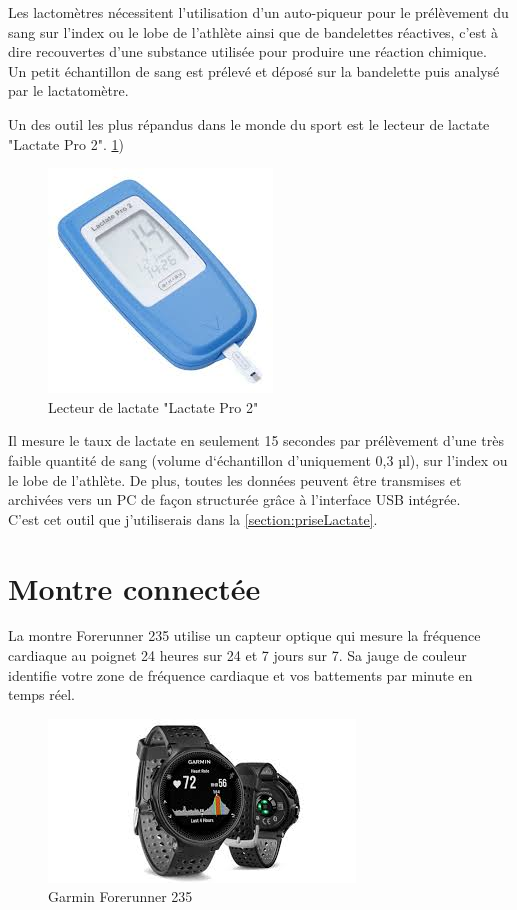     Les lactomètres nécessitent l'utilisation d'un auto-piqueur pour le prélèvement du sang sur l'index ou le lobe de l'athlète ainsi que de bandelettes réactives, c'est à dire recouvertes d'une substance utilisée pour produire une réaction chimique. \\
    
    Un petit échantillon de sang est prélevé et déposé sur la bandelette puis analysé par le lactatomètre.

    Un des outil les plus répandus dans le monde du sport est le lecteur de lactate "Lactate Pro 2". \ref{fig:lactatePro2})
    
     \begin{figure}[H]
        \centering
        \includegraphics[scale=0.7]{images/lactatePro.jpg}
        \caption{\label{fig:lactatePro2}Lecteur de lactate "Lactate Pro 2"}
    \end{figure}
    
    Il mesure le taux de lactate en seulement 15 secondes par prélèvement d'une très faible quantité de sang (volume d‘échantillon d'uniquement 0,3 µl), sur l'index ou le lobe de l'athlète. De plus, toutes les données peuvent être transmises et archivées vers un PC de façon structurée grâce à l'interface USB intégrée. \\
    C'est cet outil que j'utiliserais dans la \autoref{section:priseLactate}.
    
    \vspace{10pt}
     
     
    \section{Montre connectée}
    
    La montre Forerunner 235 utilise un capteur optique qui mesure la fréquence cardiaque au poignet 24 heures sur 24 et 7 jours sur 7. Sa jauge de couleur identifie votre zone de fréquence cardiaque et vos battements par minute en temps réel.
    
     \begin{figure}[H]
        \centering
        \includegraphics[scale=1]{images/garmin.jpg}
        \caption{\label{fig:garmin}Garmin Forerunner 235}
    \end{figure}

        

